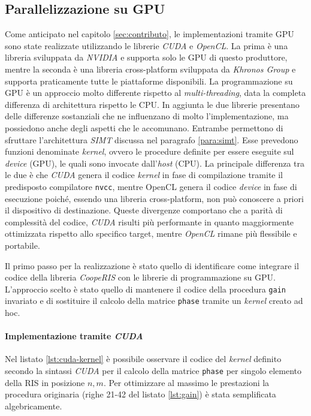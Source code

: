\subsection{Parallelizzazione su GPU}
\label{subsec:cuda}

Come anticipato nel capitolo \ref{sec:contributo}, le implementazioni tramite GPU
sono state realizzate utilizzando le librerie \textit{CUDA}\cite{cuda} e \textit{OpenCL}\cite{opencl}.
La prima è una libreria sviluppata da \textit{NVIDIA} e supporta solo le GPU di questo
produttore, mentre la seconda è una libreria cross-platform sviluppata da
\textit{Khronos Group} e supporta praticamente tutte le piattaforme disponibili.
La programmazione su GPU è un approccio molto differente rispetto al \textit{multi-threading},
data la completa differenza di architettura rispetto le CPU. In aggiunta le due librerie
presentano delle differenze sostanziali che ne influenzano di molto l'implementazione,
ma possiedono anche degli aspetti che le accomunano. Entrambe permettono di sfruttare
l'architettura \textit{SIMT} discussa nel paragrafo \ref{para:simt}. Esse prevedono
funzioni denominate \textit{kernel}, ovvero le procedure definite per essere eseguite
sul \textit{device} (GPU), le quali sono invocate dall'\textit{host} (CPU). La principale
differenza tra le due è che \textit{CUDA} genera il codice \textit{kernel} in fase
di compilazione tramite il predisposto compilatore \texttt{nvcc}, mentre OpenCL genera
il codice \textit{device} in fase di esecuzione poiché, essendo una libreria cross-platform,
non può conoscere a priori il dispositivo di destinazione. Queste divergenze comportano
che a parità di complessità del codice, \textit{CUDA} risulti più performante in
quanto maggiormente ottimizzata rispetto allo specifico target, mentre \textit{OpenCL}
rimane più flessibile e portabile\cite{cudavsopencl}.

Il primo passo per la realizzazione è stato quello di identificare come
integrare il codice della libreria \textit{CoopeRIS} con le librerie di programmazione
su GPU. L'approccio scelto è stato quello di mantenere il codice della procedura
\texttt{gain} invariato e di sostituire il calcolo della matrice \texttt{phase}
tramite un \textit{kernel} creato ad hoc.

\paragraph{Implementazione tramite \textit{CUDA}}
\label{para:cuda}

Nel listato \ref{lst:cuda-kernel} è possibile osservare il codice del \textit{kernel}
definito secondo la sintassi \textit{CUDA} per il calcolo della matrice \texttt{phase}
per singolo elemento della RIS in posizione $n, m$. Per ottimizzare al massimo le
prestazioni la procedura originaria (righe 21-42 del listato \ref{lst:gain}) è stata
semplificata algebricamente.

